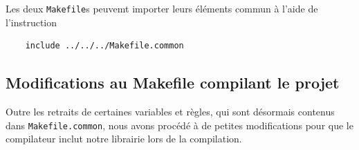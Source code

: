 \documentclass[12pt]{scrartcl}
\begin{document}
Les deux \verb|Makefile|s peuvemt importer leurs éléments commun à l'aide de l'instruction

\begin{verbatim}
    include ../../../Makefile.common
\end{verbatim}

\subsection{Modifications au Makefile compilant le projet}
Outre les retraits de certaines variables et règles, qui sont désormais contenus
dans \verb|Makefile.common|, nous avons procédé à de petites modifications pour
que le compilateur inclut notre librairie lors de la compilation.
\end{document}
